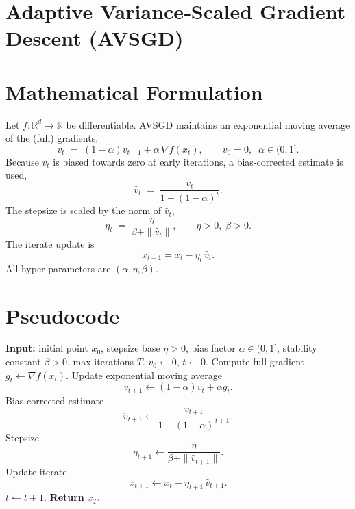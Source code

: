 \documentclass{article}
\begin{document}
\section*{Adaptive Variance‑Scaled Gradient Descent (AVSGD)}

\section*{Mathematical Formulation}
Let $f:\mathbb{R}^d\rightarrow\mathbb{R}$ be differentiable.  
AVSGD maintains an exponential moving average of the (full) gradients,
\begin{equation}
    v_t \;=\;(1-\alpha)v_{t-1}+\alpha\,\nabla f(x_t),
    \qquad v_{0}=0,\;\;\alpha\in(0,1].
    \label{eq:vt}
\end{equation}
Because $v_t$ is biased towards zero at early iterations, a bias‑corrected
estimate is used,
\begin{equation}
    \hat v_t \;=\;\frac{v_t}{1-(1-\alpha)^t}.
    \label{eq:vh}
\end{equation}
The stepsize is scaled by the norm of $\hat v_t$,
\begin{equation}
    \eta_t \;=\;\frac{\eta}{\beta+\|\hat v_t\|},
    \qquad \eta>0,\;\beta>0.
    \label{eq:et}
\end{equation}
The iterate update is
\begin{equation}
    x_{t+1}=x_t-\eta_t\,\hat v_t .
    \label{eq:update}
\end{equation}
All hyper‑parameters are $(\alpha,\eta,\beta)$.  

\section*{Pseudocode}
\begin{algorithm}[H]
\caption{Adaptive Variance‑Scaled Gradient Descent (AVSGD)}
\begin{algorithmic}[1]
\STATE \textbf{Input:} initial point $x_0$, stepsize base $\eta>0$, bias factor $\alpha\in(0,1]$, stability constant $\beta>0$, max iterations $T$.
\STATE $v_0\gets 0$, $t\gets 0$.
    \STATE Compute full gradient $g_t\gets\nabla f(x_t)$.
    \STATE Update exponential moving average 
    \[
        v_{t+1}\gets (1-\alpha)v_t+\alpha g_t .
    \]   
    \STATE Bias‑corrected estimate 
    \[
        \hat v_{t+1}\gets\frac{v_{t+1}}{1-(1-\alpha)^{\,t+1}} .
    \]   
    \STATE Stepsize 
    \[
        \eta_{t+1}\gets\frac{\eta}{\beta+\|\hat v_{t+1}\|} .
    \]   
    \STATE Update iterate 
    \[
        x_{t+1}\gets x_t-\eta_{t+1}\,\hat v_{t+1} .
    \]   
    \STATE $t\gets t+1$.
\ENDWHILE
\STATE \textbf{Return} $x_T$.
\end{algorithmic}
\end{algorithm}
\end{document}
